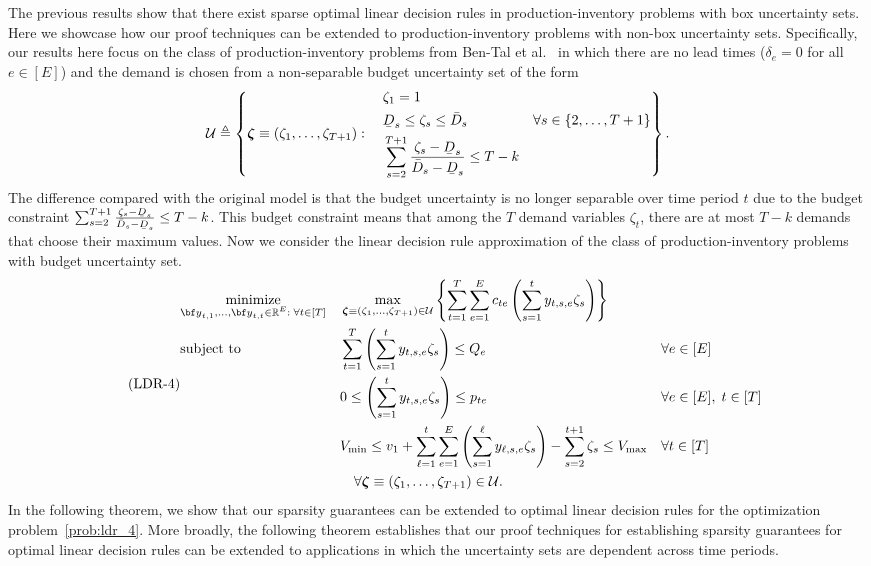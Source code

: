 \documentclass[nonblindrev,mnsc]{informs3} %
\newcommand{\by}{{\bf y}}
\newcommand{\bzeta}{{\boldsymbol{\zeta}}}
\def\Real{\mathbb{R}}
\let\R\Real
\newcommand{\ubar}[1]{\text{\b{$#1$}}}
\begin{document}
The previous results show that there exist sparse optimal linear decision rules in production-inventory problems with box uncertainty sets. Here we showcase how our proof techniques can be extended to production-inventory problems with non-box uncertainty sets. Specifically, our results here focus on the class of production-inventory problems from Ben-Tal et al.~\cite{ben2004adjustable} in which there are no lead times ($\delta_e = 0$ for all $e \in [E]$) and the demand is chosen from a non-separable budget uncertainty set of the form
\begin{align}\label{eq:newU}
  \mathcal{U} \triangleq \left \{\bzeta \equiv (\zeta_1,\ldots,\zeta_{T+1}): \quad \begin{aligned}
      &\zeta_1 = 1 \\
      &\ubar{D}_s \le \zeta_s \le \bar{D}_s & \forall s \in \{2,\ldots,T+1\}\\
      &\sum_{s=2}^{T+1} \frac{\zeta_s - \ubar{D}_s}{\bar{D}_s - \ubar{D}_s} \le T-k
  \end{aligned} \right \}. 
\end{align}
The difference compared with the original model is that the budget uncertainty  is no longer separable over time period $t$ due to the budget constraint $\sum_{s=2}^{T+1} \frac{\zeta_s - \ubar{D}_s}{\bar{D}_s - \ubar{D}_s} \le T-k$. This budget constraint means that among the $T$ demand variables $\zeta_t$, there are at most $T-k$ demands that choose their maximum values. Now we consider the linear decision rule approximation of the class of production-inventory problems with budget uncertainty set. %
\begin{equation} \label{prob:ldr_4} \tag{\textnormal{LDR-4}}
    \begin{aligned}
   & \underset{\substack{\by_{t,1},\ldots,\by_{t,t} \in \R^E:\;  \forall t \in [T]}}{\textnormal{minimize}}&& \max_{\bzeta \equiv (\zeta_1,\ldots,\zeta_{T+1}) \in \mathcal{U} } \left \{ \sum_{t=1}^T \sum_{e=1}^E c_{te} \left( \sum_{s=1}^t    y_{t,s,e} \zeta_s\right) \right \} \\
    &\textnormal{subject to}&& \sum_{t=1}^T  \left( \sum_{s=1}^t y_{t,s,e} \zeta_s \right) \le  Q_e &&  \forall e \in[E] \\
   &&& 0 \le \left( \sum_{s=1}^t y_{t,s,e} \zeta_s \right) \le  p_{te} && \forall  e\in[E],\; t \in [T]\\
   &&&V_{\textnormal{min}} \le  v_1 + \sum_{\ell=1}^t \sum_{e=1}^E \left( \sum_{s=1}^\ell y_{\ell,s,e} \zeta_s \right)  - \sum_{s=2}^{t+1} \zeta_s  \le  V_{\textnormal{max}}&& \forall  t \in [T]\\
   &&& \quad \forall \bzeta \equiv (\zeta_1,\ldots,\zeta_{T+1})\in \mathcal{U}.
    \end{aligned}
  \end{equation}
In the following theorem, we show that our sparsity guarantees can be extended to optimal linear decision rules for the optimization problem~\eqref{prob:ldr_4}. More broadly, the following theorem establishes that our proof techniques for establishing sparsity guarantees for optimal linear decision rules can be extended to applications in which the uncertainty sets are dependent across time periods. 
\end{document}
